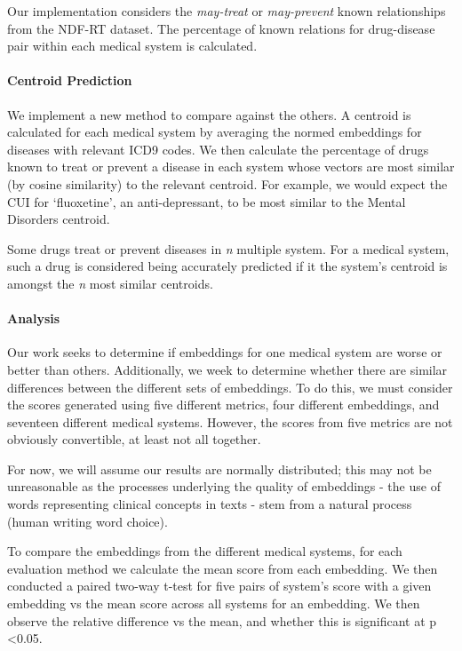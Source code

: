 \documentclass[10pt]{article}
\begin{document}
Our implementation considers the \emph{may-treat} or \emph{may-prevent} known relationships from the NDF-RT dataset. The percentage of known relations for drug-disease pair within each medical system is calculated. 

\paragraph{Centroid Prediction}
We implement a new method to compare against the others. A centroid is calculated for each medical system by averaging the normed embeddings for diseases with relevant ICD9 codes. We then calculate the percentage of drugs known to treat or prevent a disease in each system whose vectors are most similar (by cosine similarity) to the relevant centroid. For example, we would expect the CUI for `fluoxetine', an anti-depressant, to be most similar to the Mental Disorders centroid. 

Some drugs treat or prevent diseases in \emph{n} multiple system. For a medical system, such a drug is considered being accurately predicted if it the system's centroid is amongst the \emph{n} most similar centroids.  

\paragraph{Analysis}
Our work seeks to determine if embeddings for one medical system are worse or better than others. Additionally, we week to determine whether there are similar differences between the different sets of embeddings. To do this, we must consider the scores generated using five different metrics, four different embeddings, and seventeen different medical systems. However, the scores from five metrics are not obviously convertible, at least not all together. 

For now, we will assume our results are normally distributed; this may not be unreasonable as the processes underlying the quality of embeddings - the use of words representing clinical concepts in texts - stem from a natural process (human writing word choice).

To compare the embeddings from the different medical systems, for each evaluation method we calculate the mean score from each embedding. We then conducted a paired two-way t-test for five pairs of system's score with a given embedding vs the mean score across all systems for an embedding. We then observe the relative difference vs the mean, and whether this is significant at p \textless 0.05. 
\end{document}
